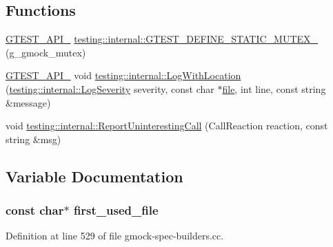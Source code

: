 \subsection*{Functions}
\begin{DoxyCompactItemize}
\item 
\hyperlink{gtest-port_8h_aa73be6f0ba4a7456180a94904ce17790}{G\+T\+E\+S\+T\+\_\+\+A\+P\+I\+\_\+} \hyperlink{namespacetesting_1_1internal_a8c4aa7be8daa7b60e293071d70a89584}{testing\+::internal\+::\+G\+T\+E\+S\+T\+\_\+\+D\+E\+F\+I\+N\+E\+\_\+\+S\+T\+A\+T\+I\+C\+\_\+\+M\+U\+T\+E\+X\+\_\+} (g\+\_\+gmock\+\_\+mutex)
\item 
\hyperlink{gtest-port_8h_aa73be6f0ba4a7456180a94904ce17790}{G\+T\+E\+S\+T\+\_\+\+A\+P\+I\+\_\+} void \hyperlink{namespacetesting_1_1internal_af271cd1fc0b62a7f4736cb3109e86a37}{testing\+::internal\+::\+Log\+With\+Location} (\hyperlink{namespacetesting_1_1internal_a203d1a8a2147a53d12bbdae40d443914}{testing\+::internal\+::\+Log\+Severity} severity, const char $\ast$\hyperlink{_07copy_08_2_read_camera_model_8m_a151631b2fd2bb776ef06c9f440a7ed74}{file}, int line, const string \&message)
\item 
void \hyperlink{namespacetesting_1_1internal_a8d99a1e87d0cea563b2bfad8a4e65276}{testing\+::internal\+::\+Report\+Uninteresting\+Call} (Call\+Reaction reaction, const string \&msg)
\end{DoxyCompactItemize}


\subsection{Variable Documentation}
\subsubsection[{\texorpdfstring{first\+\_\+used\+\_\+file}{first_used_file}}]{\setlength{\rightskip}{0pt plus 5cm}const char$\ast$ first\+\_\+used\+\_\+file}\hypertarget{gmock-spec-builders_8cc_a8eedfa563d9488da77e2972262a6adda}{}\label{gmock-spec-builders_8cc_a8eedfa563d9488da77e2972262a6adda}


Definition at line 529 of file gmock-\/spec-\/builders.\+cc.

